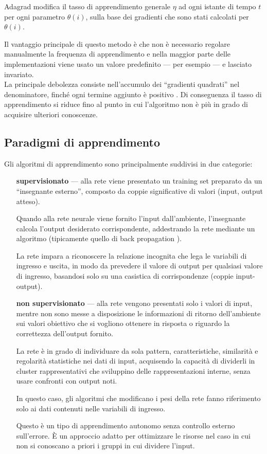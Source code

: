 Adagrad modifica il tasso di apprendimento generale $\eta$ ad ogni istante di tempo $t$ per ogni parametro $\theta(i)$, sulla base dei gradienti che sono stati calcolati per $\theta(i)$.

Il vantaggio principale di questo metodo è che non è necessario regolare manualmente la frequenza di apprendimento e nella maggior parte delle implementazioni viene usato un valore predefinito --- per esempio  --- e lasciato invariato.\\
La principale debolezza consiste nell'accumulo dei ``gradienti quadrati'' nel denominatore, finché ogni termine aggiunto è positivo \cite{ruder2016overview}. Di conseguenza il tasso di apprendimento si riduce fino al punto in cui l'algoritmo non è più in grado di acquisire ulteriori conoscenze. 

\subsection{Paradigmi di apprendimento}
\label{subsec:Paradigmi di apprendimento}

Gli algoritmi di apprendimento sono principalmente suddivisi in due categorie:
\begin{itemize}
	\item[\bfseries supervisionato] --- alla rete viene presentato un training set preparato da un ``insegnante esterno'', composto da coppie significative di valori (input, output atteso).
	
	Quando alla rete neurale viene fornito l'input dall'ambiente, l'insegnante calcola l'output desiderato corrispondente, addestrando la rete mediante un algoritmo (tipicamente quello di back propagation \cite{horikawa1992fuzzy}). 
	
	La rete impara a riconoscere la relazione incognita che lega le variabili di ingresso e uscita, in modo da prevedere il valore di output per qualsiasi valore di ingresso, basandosi solo su una casistica di corrispondenze (coppie input-output).
	
	\item[\bfseries non supervisionato] --- alla rete vengono presentati solo i valori di input, mentre non sono messe a disposizione le informazioni di ritorno dell'ambiente sui valori obiettivo che si vogliono ottenere in risposta o riguardo la correttezza dell'output fornito.
	
	La rete è in grado di individuare da sola pattern, caratteristiche, similarità e regolarità statistiche nei dati di input, acquisendo la capacità di dividerli in cluster rappresentativi che sviluppino delle rappresentazioni interne, senza usare confronti con output noti.
	
	In questo caso, gli algoritmi che modificano i pesi della rete fanno riferimento solo ai dati contenuti nelle variabili di ingresso.
	
	Questo è un tipo di apprendimento autonomo senza controllo esterno sull'errore. È un approccio adatto per ottimizzare le risorse nel caso in cui non si conoscano a priori i gruppi in cui dividere l'input.
\end{itemize}

